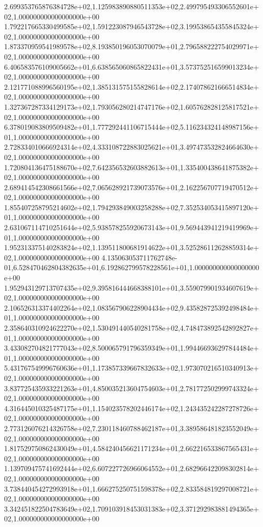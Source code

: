 2.699353765876384728e+02,1.125983890880511353e+02,2.499795493306552601e+02,1.000000000000000000e+00
1.792217665330499585e+02,1.591223087946543728e+02,3.199538654355845324e+02,1.000000000000000000e+00
1.873370959541989578e+02,8.193850196053070079e+01,2.796588222754029971e+02,1.000000000000000000e+00
6.406583576109005662e+01,6.638565060865822431e+01,3.573752516599013234e+02,1.000000000000000000e+00
2.121771088996560195e+02,1.385131575155828614e+02,2.174078621666514834e+02,1.000000000000000000e+00
1.327367287334129173e+02,1.793056280214747176e+02,1.605762828125817521e+02,1.000000000000000000e+00
6.378019083809509482e+01,1.777292441106715444e+02,5.116234324148987156e+01,1.000000000000000000e+00
2.728334010666924314e+02,4.333108722883025621e+01,3.497473532824664630e+02,1.000000000000000000e+00
1.720804136475188670e+02,7.642356532603882613e+01,1.335400438641875382e+02,1.000000000000000000e+00
2.689414542308661566e+02,7.065628921739073576e+01,2.162256707719470512e+02,1.000000000000000000e+00
1.855407258795214602e+02,1.794293849003258288e+02,7.352534053415897120e+01,1.000000000000000000e+00
2.631067114710251644e+02,5.938578255920673143e+01,9.569443941219419969e+01,1.000000000000000000e+00
1.952313375140283824e+02,1.139511800681914622e+01,3.525286112628859314e+02,1.000000000000000000e+00
4.135063053711762748e-01,6.528470462804382635e+01,6.192862799578228561e+01,1.000000000000000000e+00
1.952943129713707435e+02,9.395816444668388101e+01,3.559079901934607619e+02,1.000000000000000000e+00
2.106526313374402264e+02,1.083567906228904434e+02,9.435828725392498484e+01,1.000000000000000000e+00
2.358640310924622270e+02,1.530491440540281758e+02,4.748473892542892827e+01,1.000000000000000000e+00
3.433082704821777043e+02,8.500065791796359349e+01,1.994466936297844484e+01,1.000000000000000000e+00
5.431767549996760636e+01,1.173857339667832633e+02,1.973070216510340913e+02,1.000000000000000000e+00
3.837725435933221263e+01,4.850035213604754603e+01,2.781772502999743324e+02,1.000000000000000000e+00
4.316445010325487175e+01,1.154023578202446174e+02,1.243435242287278726e+02,1.000000000000000000e+00
2.773126076214326758e+02,7.230118460788462187e+01,3.389586481823552049e+02,1.000000000000000000e+00
1.817529750862430049e+01,4.584240456621171234e+01,2.662216533867565431e+02,1.000000000000000000e+00
1.139709475741692444e+02,6.607227726966064552e+01,2.682966422098302814e+02,1.000000000000000000e+00
3.738440454272993918e+01,1.666275250751598378e+02,2.833584819297008721e+02,1.000000000000000000e+00
3.342451822504783649e+02,1.709103918453031383e+02,3.371292983881494365e+02,1.000000000000000000e+00
